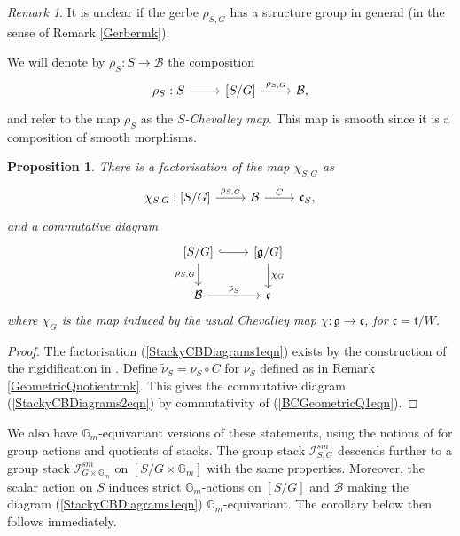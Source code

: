 \documentclass{amsart}
\newtheorem{proposition}[theorem]{Proposition}
\theoremstyle{remark}
\newtheorem{remark}[theorem]{Remark}
\numberwithin{theorem}{section}
\numberwithin{equation}{section}
\begin{document}
\begin{remark}\label{StackyChevalleyMaprmk}
    It is unclear if the gerbe $\rho_{S,G}$ has a structure group in general (in the sense of Remark \ref{Gerbermk}).
    
    We will denote by $\rho_S:S \rightarrow \mathcal B$ the composition
\begin{equation}\label{StackyChevalleyMapeqn}
\begin{tikzcd}
\rho_S:S \arrow[r] & {[S/G]} \arrow[r, "\rho_{S,G}"] & \mathcal B,
\end{tikzcd}
\end{equation}
and refer to the map $\rho_S$ as the \emph{$S$-Chevalley map}. This map is smooth since it is a composition of smooth morphisms.
\end{remark}

\begin{proposition}\label{StackyCBDiagramsprp}
There is a factorisation of the map $\chi_{S,G}$ as
\begin{equation}\label{StackyCBDiagrams1eqn}
\begin{tikzcd}
\chi_{S,G}:{[S/G]} \arrow[r, "\rho_{S,G}"] & \mathcal B \arrow[r, "C"] & \mathfrak{c}_S,
\end{tikzcd}
\end{equation}
and a commutative diagram
\begin{equation}\label{StackyCBDiagrams2eqn}
\begin{tikzcd}
{[S/G]} \arrow[r, hook] \arrow[d, "{\rho_{S,G}}"'] & {[\mathfrak{g}/G]} \arrow[d, "\chi_G"] \\
\mathcal B \arrow[r, "\tilde{\nu}_S"]            & \mathfrak{c}                        
\end{tikzcd}
\end{equation}
where $\chi_G$ is the map induced by the usual Chevalley map $\chi:\mathfrak{g} \rightarrow \mathfrak{c}$, for $\mathfrak{c} =\mathfrak{t}/W$.
\end{proposition}

\begin{proof} 
The factorisation (\ref{StackyCBDiagrams1eqn}) exists by the construction of the rigidification in \cite[Theorem A.1]{AOV}. Define $\tilde{\nu}_S = \nu_S \circ C$ for $\nu_S$ defined as in Remark \ref{GeometricQuotientrmk}. This gives the commutative diagram (\ref{StackyCBDiagrams2eqn}) by commutativity of (\ref{BCGeometricQ1eqn}).
\end{proof}

We also have $\mathbb{G}_m$-equivariant versions of these statements, using the notions of \cite{Romagny} for group actions and quotients of stacks. The group stack $\mathcal I_{S,G}^{sm}$ descends further to a group stack $\mathcal I^{sm}_{G\times \mathbb{G}_m}$ on $[S/G\times \mathbb{G}_m]$ with the same properties. Moreover, the scalar action on $S$ induces strict $\mathbb{G}_m$-actions on $[S/G]$ and $\mathcal B$ making the diagram (\ref{StackyCBDiagrams1eqn}) $\mathbb{G}_m$-equivariant. The corollary below then follows immediately.
\end{document}
